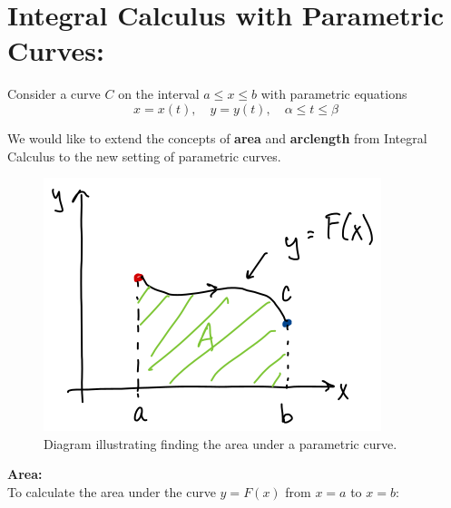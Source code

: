 \section*{Integral Calculus with Parametric Curves:}
Consider a curve \(C\) on the interval \(a\leq x \leq b\) with parametric equations
\[
x = x(t), \quad y = y(t), \quad \alpha \leq t \leq \beta
\]

We would like to extend the concepts of \textbf{area} and \textbf{arclength} from Integral Calculus to the new setting of parametric curves.\\



\begin{figure}[!h]

\includegraphics[width=\textwidth]{parametric-area.png}
\caption{Diagram illustrating finding the area under a parametric curve.}

\end{figure}

\hspace*{.2in}

\textbf{Area:}\\
To calculate the area under the curve \(y = F(x)\) from \(x=a\) to \(x=b\):

